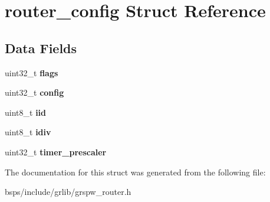 \hypertarget{structrouter__config}{}\section{router\+\_\+config Struct Reference}
\label{structrouter__config}
\subsection*{Data Fields}
\begin{DoxyCompactItemize}
\item 
\mbox{\label{structrouter__config_af73c896487d1d713565c24d316e4ee4c}} 
uint32\+\_\+t {\bfseries flags}
\item 
\mbox{\label{structrouter__config_a579f654520a77888969ab22d61b9c7dc}} 
uint32\+\_\+t {\bfseries config}
\item 
\mbox{\label{structrouter__config_abd7cc565bfddf5eb50ff153a224ad26d}} 
uint8\+\_\+t {\bfseries iid}
\item 
\mbox{\label{structrouter__config_af9533ee9d7aeb54925337707235faeb1}} 
uint8\+\_\+t {\bfseries idiv}
\item 
\mbox{\label{structrouter__config_ae251f777c01bc9da2b521c692aba7698}} 
uint32\+\_\+t {\bfseries timer\+\_\+prescaler}
\end{DoxyCompactItemize}


The documentation for this struct was generated from the following file\+:\begin{DoxyCompactItemize}
\item 
bsps/include/grlib/grspw\+\_\+router.\+h\end{DoxyCompactItemize}
